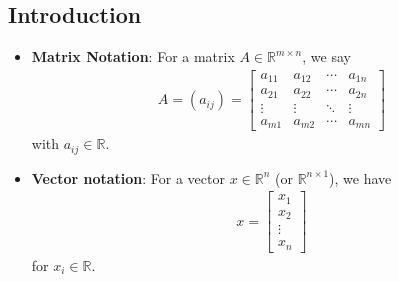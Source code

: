 \documentclass{report}
\begin{document}
    \subsection{Introduction}
    \bigbreak \noindent 
    \begin{itemize}
        \item \textbf{Matrix Notation}: For a matrix $A \in \mathbb{R}^{m\times n} $, we say
            \begin{align*}
                A = (a_{ij}) = \begin{bmatrix}
                    a_{11} & a_{12} & \cdots & a_{1n} \\
                    a_{21} & a_{22} & \cdots & a_{2n} \\
                    \vdots & \vdots & \ddots & \vdots \\
                    a_{m1} & a_{m2} & \cdots & a_{mn}
                \end{bmatrix}
            \end{align*}
            with $a_{ij} \in \mathbb{R} $.
        \item \textbf{Vector notation}: For a vector $x \in \mathbb{R}^{n} $ (or $\mathbb{R}^{n\times 1} $), we have
            \begin{align*}
                x = \begin{bmatrix}
                    x_{1} \\ x_{2} \\ \vdots \\ x_{n}
                \end{bmatrix}
            \end{align*}
            for $x_{i} \in \mathbb{R} $.


\end{itemize}
\end{document}

